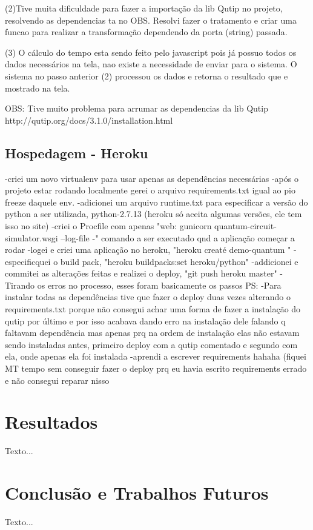 \documentclass[a4paper, 12pt, oneside]{book}
\begin{document}
(2)Tive muita dificuldade para fazer a importação da lib Qutip no projeto, resolvendo as dependencias ta no OBS. Resolvi fazer o tratamento e criar uma funcao para realizar a transformação dependendo da porta (string) passada.

(3) O cálculo do tempo esta sendo feito pelo javascript pois já possuo todos os dados necessários na tela, nao existe a necessidade de enviar para o sistema. O sistema no passo anterior (2) processou os dados e retorna o resultado que e mostrado na tela.

OBS: Tive muito problema para arrumar as dependencias da lib Qutip
http://qutip.org/docs/3.1.0/installation.html

\section{Hospedagem - Heroku}

-criei um novo virtualenv para usar apenas as dependências necessárias
-após o projeto estar rodando localmente gerei o arquivo requirements.txt igual ao pio freeze daquele env.
-adicionei um arquivo runtime.txt para especificar a versão do python a ser utilizada, python-2.7.13 (heroku só aceita algumas versões, ele tem isso no site)
-criei o Procfile com apenas "web: gunicorn quantum-circuit-simulator.wsgi --log-file -" comando a ser executado qnd a aplicação começar a rodar
-logei e criei uma aplicação no heroku, "heroku creaté demo-quantum "
-especificquei o build pack, "heroku buildpacks:set heroku/python"
-addicionei e commitei as alterações feitas e realizei o deploy, "git push heroku master"
-Tirando os erros no processo, esses foram basicamente os passos
PS:
-Para instalar todas as dependências tive que fazer o deploy duas vezes alterando o requirements.txt porque não consegui achar uma forma de fazer a instalação do qutip por último e por isso acabava dando erro na instalação dele falando q faltavam dependência mas apenas prq na ordem de instalação elas não estavam sendo instaladas antes, primeiro deploy com a qutip comentado e segundo com ela, onde apenas ela foi instalada
-aprendi a escrever requirements hahaha (fiquei MT tempo sem conseguir fazer o deploy prq eu havia escrito requirements errado e não consegui reparar nisso


\chapter{Resultados}
\thispagestyle{empty} 

Texto...

\chapter{Conclusão e Trabalhos Futuros}
\thispagestyle{empty} 

Texto...
\cite{mermin}
\cite{qutip.org}
\cite{test2}
\cite{davyw}
\cite{quirk}
\cite{simulatorList}



\end{document}
